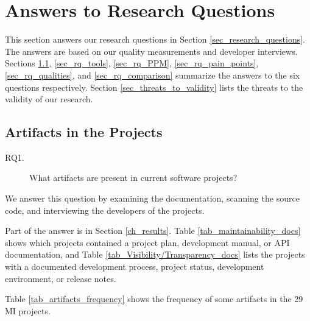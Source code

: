 \chapter{Answers to Research Questions}
\label{ch_answers}

This section answers our research questions in Section \ref{sec_research_questions}. The answers are based on our quality measurements and developer interviews. Sections \ref{sec_rq_artifacts}, \ref{sec_rq_tools}, \ref{sec_rq_PPM}, \ref{sec_rq_pain_points}, \ref{sec_rq_qualities}, and \ref{sec_rq_comparison} summarize the answers to the six questions respectively. Section \ref{sec_threats_to_validity} lists the threats to the validity of our research.

\section{Artifacts in the Projects}
\label{sec_rq_artifacts}
\begin{description}
\item[RQ1.] What artifacts are present in current software projects?
\end{description}

We answer this question by examining the documentation, scanning the source code, and interviewing the developers of the projects.

Part of the answer is in Section \ref{ch_results}. Table \ref{tab_maintainability_docs} shows which projects contained a project plan, development manual, or API documentation, and Table \ref{tab_Visibility/Transparency_docs} lists the projects with a documented development process, project status, development environment, or release notes.

Table \ref{tab_artifacts_frequency} shows the frequency of some artifacts in the 29 MI projects.

